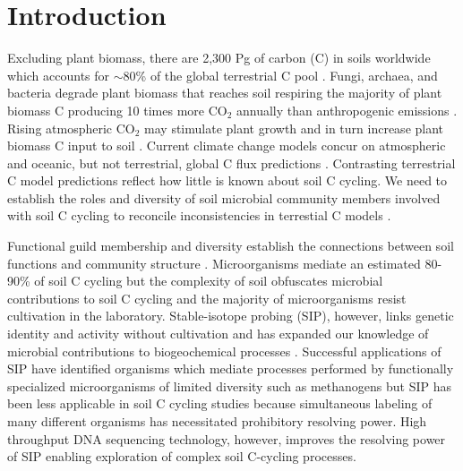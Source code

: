 \section{Introduction}
Excluding plant biomass, there are 2,300 Pg of carbon (C) in soils
worldwide which accounts for $\sim$80\% of the global terrestrial C pool
\citep{Amundson_2001,BATJES_1996}. Fungi, archaea, and bacteria degrade plant
biomass that reaches soil respiring the majority of plant biomass C producing
10 times more CO$_{2}$ annually than anthropogenic emissions
\citep{chapin2002principles}. Rising atmospheric CO$_{2}$ may stimulate plant
growth and in turn increase plant biomass C input to soil
\citep{Groenigen_2006}. Current climate change models concur on atmospheric and
oceanic, but not terrestrial, global C flux predictions
\citep{Friedlingstein_2006}. Contrasting terrestrial C model predictions
reflect how little is known about soil C cycling. We need to establish the
roles and diversity of soil microbial community members involved with soil
C cycling to reconcile inconsistencies in terrestial C models
\citep{Neff_2001,McGuire2010}.

Functional guild membership and diversity establish the connections between
soil functions and community structure \citep{O_Donnell_2002}. Microorganisms
mediate an estimated 80-90\% of soil C cycling
\citep{ColemanCrossley_1996,Nannipieri_2003} but the complexity of soil
obfuscates microbial contributions to soil C cycling and the majority of
microorganisms resist cultivation in the laboratory. Stable-isotope probing
(SIP), however, links genetic identity and activity without cultivation and has
expanded our knowledge of microbial contributions to biogeochemical processes
\citep{Chen_Murrell_2010}. Successful applications of SIP have identified
organisms which mediate processes performed by functionally specialized
microorganisms of limited diversity such as methanogens \citep{Lu_2005} but SIP
has been less applicable in soil C cycling studies because simultaneous
labeling of many different organisms has necessitated prohibitory resolving
power. High throughput DNA sequencing technology, however, improves the
resolving power of SIP enabling exploration of complex soil C-cycling
processes.

